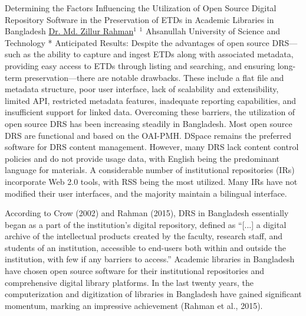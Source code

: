 \begin{abstract_online}{Determining the Factors Influencing the Utilization of Open Source Digital Repository Software in the Preservation of ETDs in Academic Libraries in Bangladesh}{%
    \underline{Dr. Md. Zillur Rahman}$^{1}$}{%
    }{%
    $^1$ Ahsanullah University of Science and Technology *\newline{}
}
Anticipated Results: Despite the advantages of open source DRS—such as the ability to capture and ingest ETDs along with associated metadata, providing easy access to ETDs through listing and searching, and ensuring long-term preservation—there are notable drawbacks. These include a flat file and metadata structure, poor user interface, lack of scalability and extensibility, limited API, restricted metadata features, inadequate reporting capabilities, and insufficient support for linked data. Overcoming these barriers, the utilization of open source DRS has been increasing steadily in Bangladesh. Most open source DRS are functional and based on the OAI-PMH. DSpace remains the preferred software for DRS content management. However, many DRS lack content control policies and do not provide usage data, with English being the predominant language for materials. A considerable number of institutional repositories (IRs) incorporate Web 2.0 tools, with RSS being the most utilized. Many IRs have not modified their user interfaces, and the majority maintain a bilingual interface.

According to Crow (2002) and Rahman (2015), DRS in Bangladesh essentially began as a part of the institution's digital repository, defined as “[...] a digital archive of the intellectual products created by the faculty, research staff, and students of an institution, accessible to end-users both within and outside the institution, with few if any barriers to access.” Academic libraries in Bangladesh have chosen open source software for their institutional repositories and comprehensive digital library platforms. In the last twenty years, the computerization and digitization of libraries in Bangladesh have gained significant momentum, marking an impressive achievement (Rahman et al., 2015).

\end{abstract_online}

